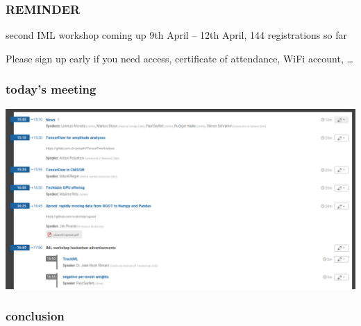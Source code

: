 \begin{frame}
  \frametitle{REMINDER}
  \begin{block}{second IML workshop coming up}
    9th April -- 12th April, 144 registrations so far

\end{block}
Please sign up early if you need access, certificate of attendance, WiFi account, \dots
\end{frame}

\begin{frame}
  \frametitle{today's meeting}
  \includegraphics[width=.95\textwidth]{./agenda.png}
\end{frame}

\begin{frame}
  \frametitle{conclusion}


  \vspace{.3\textheight}

\end{frame}

\appendix

